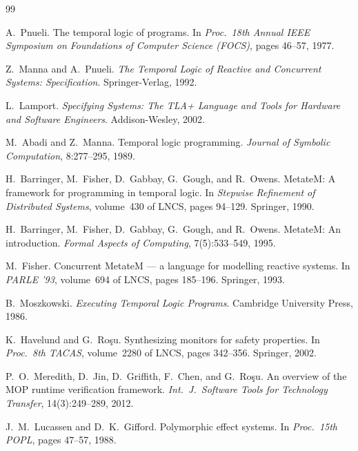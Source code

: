 \documentclass[11pt,a4paper]{article}
\begin{document}
\begin{thebibliography}{99}\small

A.~Pnueli.
\newblock The temporal logic of programs.
\newblock In \emph{Proc.\ 18th Annual IEEE Symposium on Foundations of Computer
  Science (FOCS)}, pages 46--57, 1977.

Z.~Manna and A.~Pnueli.
\newblock \emph{The Temporal Logic of Reactive and Concurrent Systems:
  Specification}.
\newblock Springer-Verlag, 1992.

L.~Lamport.
\newblock \emph{Specifying Systems: The TLA+ Language and Tools for Hardware
  and Software Engineers}.
\newblock Addison-Wesley, 2002.

M.~Abadi and Z.~Manna.
\newblock Temporal logic programming.
\newblock \emph{Journal of Symbolic Computation}, 8:277--295, 1989.

H.~Barringer, M.~Fisher, D.~Gabbay, G.~Gough, and R.~Owens.
\newblock MetateM: A framework for programming in temporal logic.
\newblock In \emph{Stepwise Refinement of Distributed Systems}, volume~430 of
  LNCS, pages 94--129. Springer, 1990.

H.~Barringer, M.~Fisher, D.~Gabbay, G.~Gough, and R.~Owens.
\newblock MetateM: An introduction.
\newblock \emph{Formal Aspects of Computing}, 7(5):533--549, 1995.

M.~Fisher.
\newblock Concurrent MetateM --- a language for modelling reactive systems.
\newblock In \emph{PARLE '93}, volume~694 of LNCS, pages 185--196.
  Springer, 1993.

B.~Moszkowski.
\newblock \emph{Executing Temporal Logic Programs}.
\newblock Cambridge University Press, 1986.

K.~Havelund and G.~Ro\c{s}u.
\newblock Synthesizing monitors for safety properties.
\newblock In \emph{Proc.\ 8th TACAS}, volume~2280 of LNCS, pages 342--356.
  Springer, 2002.

P.~O.~Meredith, D.~Jin, D.~Griffith, F.~Chen, and G.~Ro\c{s}u.
\newblock An overview of the MOP runtime verification framework.
\newblock \emph{Int.\ J.\ Software Tools for Technology Transfer},
  14(3):249--289, 2012.

J.~M.~Lucassen and D.~K.~Gifford.
\newblock Polymorphic effect systems.
\newblock In \emph{Proc.\ 15th POPL}, pages 47--57, 1988.


\end{thebibliography}
\end{document}
